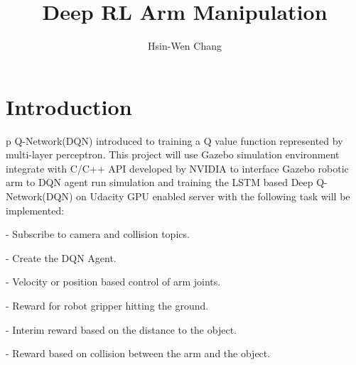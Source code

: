 \documentclass[10pt,journal,compsoc]{IEEEtran}
\begin{document}
\title{Deep RL Arm Manipulation}

\author{Hsin-Wen Chang}

%
{}

\maketitle
\IEEEdisplaynontitleabstractindextext
\IEEEpeerreviewmaketitle
\section{Introduction}
\label{sec:introduction}

p Q-Network(DQN) introduced to training a Q value function represented by multi-layer perceptron. This project will use Gazebo simulation environment integrate with C/C++ API developed by NVIDIA to interface Gazebo robotic arm to DQN agent run simulation and training the LSTM based Deep Q-Network(DQN) on Udacity GPU enabled server with the following task will be implemented:  

- Subscribe to camera and collision topics.  

- Create the DQN Agent.

- Velocity or position based control of arm joints.

- Reward for robot gripper hitting the ground.

- Interim reward based on the distance to the object.

- Reward based on collision between the arm and the object.
\end{document}
